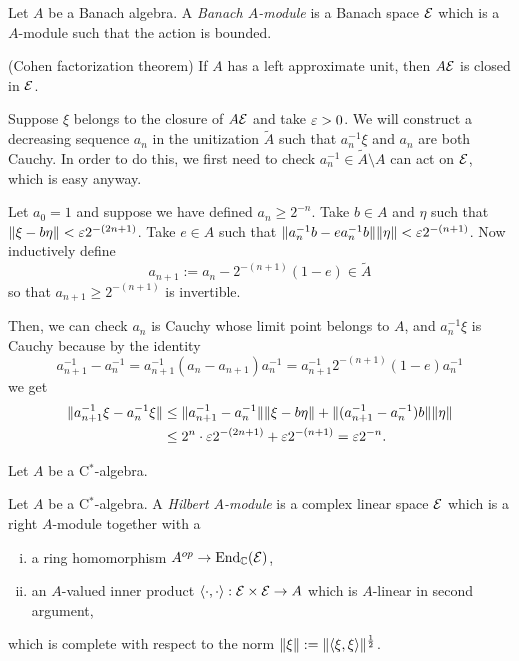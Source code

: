 \documentclass{../../large}
\begin{document}
\begin{prb}
Let $A$ be a Banach algebra.
A \emph{Banach $A$-module} is a Banach space $\mathcal{E}$ which is a $A$-module such that the action is bounded.
\begin{parts}
\item (Cohen factorization theorem) If $A$ has a left approximate unit, then $A\mathcal{E}$ is closed in $\mathcal{E}$.
\end{parts}
\end{prb}
\begin{pf}
Suppose $\xi$ belongs to the closure of $A\mathcal{E}$ and take $\varepsilon>0$.
We will construct a decreasing sequence $a_n$ in the unitization $\tilde A$ such that $a_n^{-1}\xi$ and $a_n$ are both Cauchy.
In order to do this, we first need to check $a_n^{-1}\in\tilde A\setminus A$ can act on $\mathcal{E}$, which is easy anyway.

Let $a_0=1$ and suppose we have defined $a_n\ge 2^{-n}$.
Take $b\in A$ and $\eta$ such that $\|\xi-b\eta\|<\varepsilon2^{-(2n+1)}$.
Take $e\in A$ such that $\|a_n^{-1}b-ea_n^{-1}b\|\|\eta\|<\varepsilon2^{-(n+1)}$.
Now inductively define
\[a_{n+1}:=a_n-2^{-(n+1)}(1-e)\in\tilde A\]
so that $a_{n+1}\ge2^{-(n+1)}$ is invertible.

Then, we can check $a_n$ is Cauchy whose limit point belongs to $A$, and
$a_n^{-1}\xi$ is Cauchy because by the identity
\[a_{n+1}^{-1}-a_n^{-1}=a_{n+1}^{-1}(a_n-a_{n+1})a_n^{-1}=a_{n+1}^{-1}2^{-(n+1)}(1-e)a_n^{-1}\]
we get
\begin{align*}
\|a_{n+1}^{-1}\xi-a_n^{-1}\xi\|
&\le\|a_{n+1}^{-1}-a_n^{-1}\|\|\xi-b\eta\|+\|(a_{n+1}^{-1}-a_n^{-1})b\|\|\eta\|\\
&\le2^n\cdot\varepsilon2^{-(2n+1)}+\varepsilon2^{-(n+1)}=\varepsilon2^{-n}.
\end{align*}
\end{pf}

\begin{prb}
Let $A$ be a C$^*$-algebra.
\end{prb}

\begin{prb}
Let $A$ be a C$^*$-algebra.
A \emph{Hilbert $A$-module} is a complex linear space $\mathcal{E}$ which is a right $A$-module together with a
\begin{enumerate}[(i)]
\item a ring homomorphism $A^{op}\to\operatorname{End}_{\mathbb{C}}(\mathcal{E})$,
\item an $A$-valued inner product $\langle\cdot,\cdot\rangle:\mathcal{E}\times\mathcal{E}\to A$ which is $A$-linear in second argument,
\end{enumerate}
which is complete with respect to the norm $\|\xi\|:=\|\langle\xi,\xi\rangle\|^{\frac12}$.
\begin{parts}
\item
\end{parts}
\end{prb}
\end{document}
